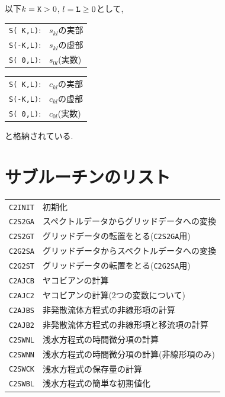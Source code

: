\documentclass[a4j,fleqn]{jarticle}
\begin{document}
以下$k=\mbox{\tt K}>0$, $l=\mbox{\tt L}\ge 0$として,
\begin{center}
\begin{tabular}{ll}
{\tt S( K,L)}:& $s_{kl}$の実部\\
{\tt S(-K,L)}:& $s_{kl}$の虚部\\
{\tt S( 0,L)}:& $s_{0l}$(実数)
\end{tabular}
\quad
\begin{tabular}{ll}
{\tt S( K,L)}:& $c_{kl}$の実部\\
{\tt S(-K,L)}:& $c_{kl}$の虚部\\
{\tt S( 0,L)}:& $c_{0l}$(実数)
\end{tabular}
\end{center}
と格納されている.


\section{サブルーチンのリスト}

\vspace{1em}
\begin{tabular}{ll}
{\tt C2INIT} & 初期化\\
{\tt C2S2GA} & スペクトルデータからグリッドデータへの変換\\
{\tt C2S2GT} & グリッドデータの転置をとる({\tt C2S2GA}用)\\
{\tt C2G2SA} & グリッドデータからスペクトルデータへの変換\\
{\tt C2G2ST} & グリッドデータの転置をとる({\tt C2G2SA}用)\\
{\tt C2AJCB} & ヤコビアンの計算\\
{\tt C2AJC2} & ヤコビアンの計算(2つの変数について)\\
{\tt C2AJBS} & 非発散流体方程式の非線形項の計算\\
{\tt C2AJB2} & 非発散流体方程式の非線形項と移流項の計算\\
{\tt C2SWNL} & 浅水方程式の時間微分項の計算\\
{\tt C2SWNN} & 浅水方程式の時間微分項の計算(非線形項のみ)\\
{\tt C2SWCK} & 浅水方程式の保存量の計算\\
{\tt C2SWBL} & 浅水方程式の簡単な初期値化
\end{tabular}

\end{document}
